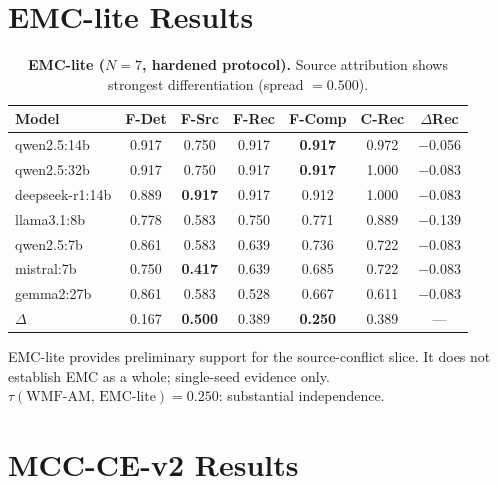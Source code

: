 \documentclass{article}
\begin{document}
\section{EMC-lite Results}
\label{app:emclite}

\begin{table}[h]
\centering
\small
\begin{tabular}{lcccccc}
\toprule
Model & F-Det & F-Src & F-Rec & F-Comp & C-Rec & $\Delta$Rec \\
\midrule
qwen2.5:14b     & 0.917 & 0.750 & 0.917 & \textbf{0.917} & 0.972 & $-$0.056 \\
qwen2.5:32b     & 0.917 & 0.750 & 0.917 & \textbf{0.917} & 1.000 & $-$0.083 \\
deepseek-r1:14b & 0.889 & \textbf{0.917} & 0.917 & 0.912 & 1.000 & $-$0.083 \\
llama3.1:8b     & 0.778 & 0.583 & 0.750 & 0.771 & 0.889 & $-$0.139 \\
qwen2.5:7b      & 0.861 & 0.583 & 0.639 & 0.736 & 0.722 & $-$0.083 \\
mistral:7b      & 0.750 & \textbf{0.417} & 0.639 & 0.685 & 0.722 & $-$0.083 \\
gemma2:27b      & 0.861 & 0.583 & 0.528 & 0.667 & 0.611 & $-$0.083 \\
\midrule
$\Delta$ & 0.167 & \textbf{0.500} & 0.389 & \textbf{0.250} & 0.389 & — \\
\bottomrule
\end{tabular}
\caption{\textbf{EMC-lite ($N{=}7$, hardened protocol).}
Source attribution shows strongest differentiation (spread $= 0.500$).}
\label{tab:emclite}
\end{table}

EMC-lite provides preliminary support for the source-conflict slice.
It does not establish EMC as a whole; single-seed evidence only.
$\tau(\text{WMF-AM, EMC-lite}) = 0.250$: substantial independence.

\section{MCC-CE-v2 Results}
\label{app:mccv2}
\end{document}
